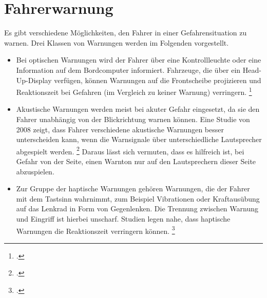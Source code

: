 	\section{Fahrerwarnung}
		Es gibt verschiedene Möglichkeiten, den Fahrer in einer Gefahrensituation zu warnen. Drei Klassen von Warnungen werden im Folgenden vorgestellt.
		\begin{itemize}
			\item Bei optischen Warnungen wird der Fahrer über eine Kontrollleuchte oder eine Information auf dem Bordcomputer informiert. Fahrzeuge, die über ein Head-Up-Display verfügen, können Warnungen auf die Frontscheibe projizieren und Reaktionszeit bei Gefahren (im Vergleich zu keiner Warnung) verringern.
			\footcite[Vgl.][]{Kazazi2015HeadUpDisplay}
			\item Akustische Warnungen werden meist bei akuter Gefahr eingesetzt, da sie den Fahrer unabhängig von der Blickrichtung warnen können. Eine Studie von 2008 zeigt, dass Fahrer verschiedene akustische Warnungen besser unterscheiden kann, wenn die Warnsignale über unterschiedliche Lautsprecher abgespielt werden. \footcite[Vgl.][]{Sato2008SoundWarnings} Daraus lässt sich vermuten, dass es hilfreich ist, bei Gefahr von der Seite, einen Warnton nur auf den Lautsprechern dieser Seite abzuspielen.
			\item Zur Gruppe der haptische Warnungen gehören Warnungen, die der Fahrer mit dem Tastsinn wahrnimmt, zum Beispiel Vibrationen oder Kraftausübung auf das Lenkrad in Form von Gegenlenken. Die Trennung zwischen Warnung und Eingriff ist hierbei unscharf. Studien legen nahe, dass haptische Warnungen die Reaktionszeit verringern können. \footcite[Vgl.][]{Petermeijer2015Haptic}
		\end{itemize}
